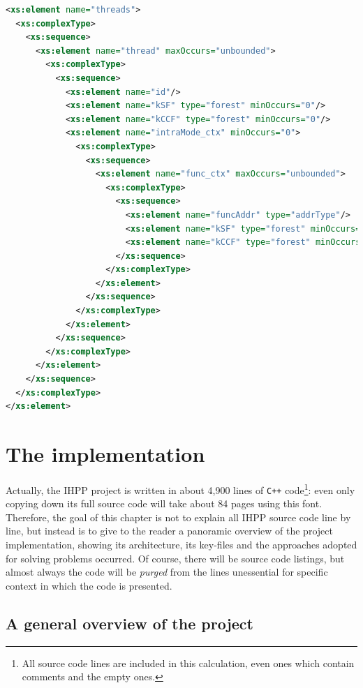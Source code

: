 \documentclass[a4paper,10pt]{report}
\begin{document}
\begin{lstlisting}[language=XML, frame=leftline, 
caption={an extract from \texttt{outputschema.xsd}}, label={xsd},
morekeywords={encoding, xs:schema,xs:element,
xs:complexType,xs:sequence,xs:attribute}]
<xs:element name="threads">
  <xs:complexType>
    <xs:sequence>
      <xs:element name="thread" maxOccurs="unbounded">
        <xs:complexType>
          <xs:sequence>
            <xs:element name="id"/>
            <xs:element name="kSF" type="forest" minOccurs="0"/>
            <xs:element name="kCCF" type="forest" minOccurs="0"/>
            <xs:element name="intraMode_ctx" minOccurs="0">
              <xs:complexType>
                <xs:sequence>
                  <xs:element name="func_ctx" maxOccurs="unbounded">
                    <xs:complexType>
                      <xs:sequence>
                        <xs:element name="funcAddr" type="addrType"/>
                        <xs:element name="kSF" type="forest" minOccurs="0"/>
                        <xs:element name="kCCF" type="forest" minOccurs="0"/>
                      </xs:sequence>
                    </xs:complexType>
                  </xs:element>
                </xs:sequence>
              </xs:complexType>
            </xs:element>
          </xs:sequence>
        </xs:complexType>
      </xs:element>
    </xs:sequence>
  </xs:complexType>
</xs:element>
\end{lstlisting}


\chapter{The implementation}

Actually, the IHPP project is written in about 4,900 lines of \verb|C++| 
code\footnote{All source code lines are included in this calculation, even ones which 
contain comments and the empty ones.}: 
even only copying down its full source code will take about 84 pages using
this font. Therefore, the goal of this chapter is not to explain 
all IHPP source code line by line, but instead is to give to the reader 
a panoramic overview of the project implementation, showing its architecture, 
its key-files and the approaches adopted for solving problems occurred.
Of course, there will be source code listings, but almost always the code will be
\emph{purged} from the lines unessential for specific context in which the code is presented.

\section{A general overview of the project}
\end{document}

